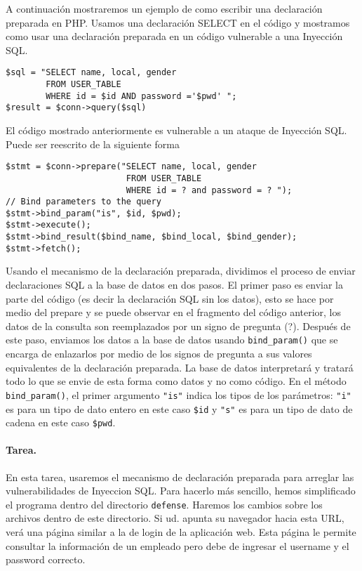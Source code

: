 A continuación mostraremos un ejemplo de como escribir una declaración preparada en PHP. Usamos una declaración SELECT en el código y mostramos como usar una declaración preparada en un código vulnerable a una Inyección SQL.


\begin{lstlisting}
$sql = "SELECT name, local, gender  
        FROM USER_TABLE 
        WHERE id = $id AND password ='$pwd' ";
$result = $conn->query($sql)
\end{lstlisting}

El código mostrado anteriormente es vulnerable a un ataque de Inyección SQL.
Puede ser reescrito de la siguiente forma


\begin{lstlisting}
$stmt = $conn->prepare("SELECT name, local, gender
                        FROM USER_TABLE 
                        WHERE id = ? and password = ? ");
// Bind parameters to the query
$stmt->bind_param("is", $id, $pwd);
$stmt->execute();
$stmt->bind_result($bind_name, $bind_local, $bind_gender);
$stmt->fetch();
\end{lstlisting}

Usando el mecanismo de la declaración preparada, dividimos el proceso de enviar declaraciones SQL a la base de datos en dos pasos.
El primer paso es enviar la parte del código (es decir la declaración SQL sin los datos), esto se hace por medio del prepare y se puede observar en el fragmento del código anterior, los datos de la consulta son reemplazados por un signo de pregunta (?). Después de este paso, enviamos los datos a la base de datos usando {\tt bind\_param()} que se encarga de enlazarlos por medio de los signos de pregunta a sus valores equivalentes de la declaración preparada.
La base de datos interpretará y tratará todo lo que se envie de esta forma como datos y no como código. 
En el método {\tt bind\_param()}, el primer argumento {\tt "is"} indica los tipos de los parámetros: \texttt{"i"} es para un tipo de dato entero en este caso {\tt \$id} y \texttt{"s"} es para un tipo de dato de cadena en este caso {\tt \$pwd}.

\paragraph{Tarea.} En esta tarea, usaremos el mecanismo de declaración preparada para arreglar las vulnerabilidades de Inyeccion SQL. Para hacerlo más sencillo, hemos simplificado el programa dentro del directorio \texttt{defense}. Haremos los cambios sobre los archivos dentro de este directorio.
Si ud. apunta su navegador hacia esta URL, verá una página similar a la de login de la aplicación web. Esta página le permite consultar la información de un empleado pero debe de ingresar el username y el password correcto.


